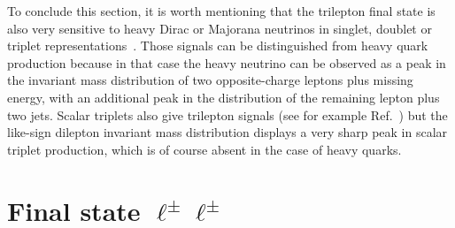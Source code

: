 \documentclass[12pt,a4paper]{article}
\begin{document}
To conclude this section, it is worth mentioning that the trilepton final state is also very sensitive to heavy Dirac or Majorana neutrinos in singlet, doublet or triplet representations~\cite{AguilarSaavedra:2009ik}. Those signals can be distinguished from heavy quark production because in that case the heavy neutrino can be observed as a peak in the invariant mass distribution of two opposite-charge leptons plus missing energy, with an additional peak in the distribution of the remaining lepton plus two jets. Scalar triplets also give trilepton signals (see for example Ref.~\cite{delAguila:2008cj}) but the like-sign dilepton invariant mass distribution displays a very sharp peak in scalar triplet production, which is of course absent in the case of heavy quarks.
\section{Final state $\ell^\pm \ell^\pm$}
\label{sec:2lik}
\end{document}
